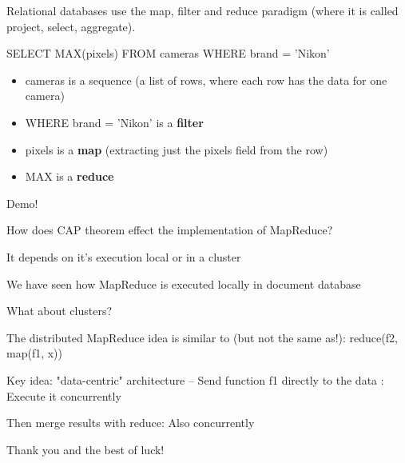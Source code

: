 \documentclass{beamer}
\begin{document}
\begin{slide}{
\item Relational databases use the map, filter and reduce paradigm (where it is called project, select, aggregate).
\item SELECT MAX(pixels) FROM  cameras WHERE brand = 'Nikon' 
\begin{itemize}
\item cameras is a sequence (a list of rows, where each row has the data for one camera)
\item WHERE brand = 'Nikon'  is a \textbf{filter}
\item pixels is a \textbf{map} (extracting just the pixels field from the row)
\item MAX is a \textbf{reduce}
\end{itemize}
\item Demo!
}\end{slide}

\begin{slide}{
\item How does CAP theorem effect the implementation of MapReduce?
\item It depends on it's execution local or in a cluster  
\item We have seen how MapReduce is executed locally in document database 
\item What about clusters?
}\end{slide}

\begin{slide}{
\item The distributed MapReduce idea is similar to (but not the same as!): reduce(f2, map(f1, x))
\item Key idea: "data-centric" architecture –  Send function f1 directly to the data : Execute it concurrently
\item Then merge results with reduce: Also concurrently
}\end{slide}

\begin{slide}{
\item Thank you and the best of luck!
}\end{slide}
\end{document}
